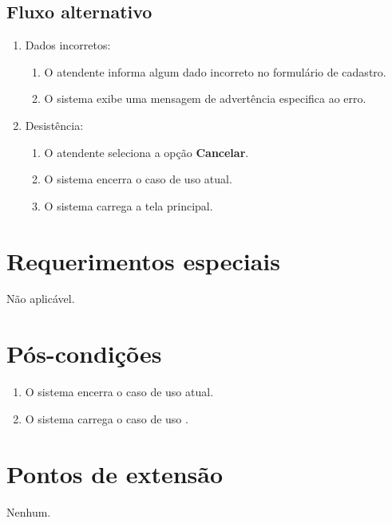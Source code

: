 \subsection{Fluxo alternativo}

\begin{enumerate}
	\item Dados incorretos:
	\begin{enumerate}
		\item O atendente informa algum dado incorreto no formulário de cadastro. 
		\item O sistema exibe uma mensagem de advertência especifica ao erro.
	\end{enumerate}	
	\item Desistência:
	\begin{enumerate}
		\item O atendente seleciona a opção \textbf{Cancelar}.
		\item O sistema encerra o caso de uso atual.
		\item O sistema carrega a tela principal.
	\end{enumerate}
\end{enumerate}

\section{Requerimentos especiais}

Não aplicável.

\section{Pós-condições}

\begin{enumerate}
	\item O sistema encerra o caso de uso atual.
	\item O sistema carrega o caso de uso .
\end{enumerate}

\section{Pontos de extensão}

Nenhum.